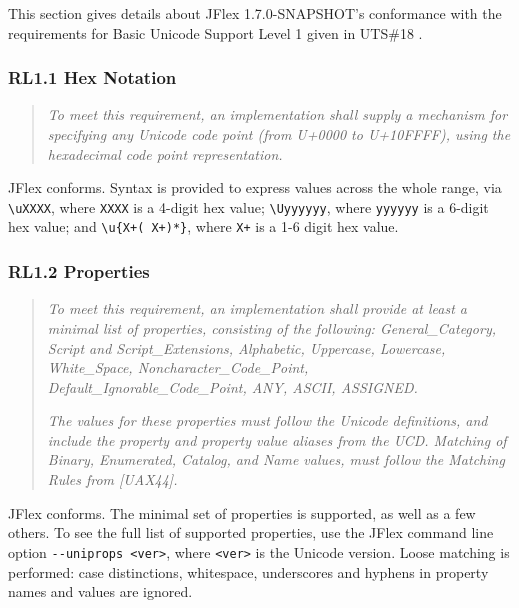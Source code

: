 
This section gives details about JFlex 1.7.0-SNAPSHOT's conformance with
the requirements for Basic Unicode Support Level 1 given in UTS\#18
\autocite{unicode_rep}.

\subsubsection{RL1.1 Hex Notation}\label{rl1.1-hex-notation}

\begin{quote}
\emph{To meet this requirement, an implementation shall supply a
mechanism for specifying any Unicode code point (from U+0000 to
U+10FFFF), using the hexadecimal code point representation.}
\end{quote}

JFlex conforms. Syntax is provided to express values across the whole
range, via \texttt{\textbackslash{}uXXXX}, where \texttt{XXXX} is a
4-digit hex value; \texttt{\textbackslash{}Uyyyyyy}, where
\texttt{yyyyyy} is a 6-digit hex value; and
\texttt{\textbackslash{}u\{X+(\ X+)*\}}, where \texttt{X+} is a 1-6
digit hex value.

\subsubsection{RL1.2 Properties}\label{rl1.2-properties}

\begin{quote}
\emph{To meet this requirement, an implementation shall provide at least
a minimal list of properties, consisting of the following:
General\_Category, Script and Script\_Extensions, Alphabetic, Uppercase,
Lowercase, White\_Space, Noncharacter\_Code\_Point,
Default\_Ignorable\_Code\_Point, ANY, ASCII, ASSIGNED.}

\emph{The values for these properties must follow the Unicode
definitions, and include the property and property value aliases from
the UCD. Matching of Binary, Enumerated, Catalog, and Name values, must
follow the Matching Rules from {[}UAX44{]}.}
\end{quote}

JFlex conforms. The minimal set of properties is supported, as well as a
few others. To see the full list of supported properties, use the JFlex
command line option \texttt{-\/-uniprops\ \textless{}ver\textgreater{}},
where \texttt{\textless{}ver\textgreater{}} is the Unicode version.
Loose matching is performed: case distinctions, whitespace, underscores
and hyphens in property names and values are ignored.

